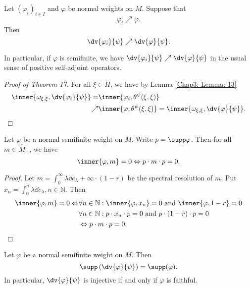 \begin{theorem}
    Let $(\varphi_i)_{i\in I}$ and $\varphi$ be normal weights on $M$. Suppose that
    \[
        \varphi_i\nearrow \varphi.
    \]
    Then
    \[
        \dv{\varphi_i}{\psi}\nearrow\dv{\varphi}{\psi}.
    \]
\end{theorem}
\begin{remark}
    In particular, if $\varphi$ is semifinite, we have $\dv{\varphi_i}{\psi}\nearrow\dv{\varphi}{\psi}$ in the usual sense of positive self-adjoint operators.
\end{remark}
\begin{proof}[Proof of Theorem 17]
    For all $\xi\in H$, we have by Lemma \ref{Chap3: Lemma: 13}
    \[
        \begin{split}
            \inner{\omega_{\xi,\xi},\dv{\varphi_i}{\psi}}=&\inner{\varphi_i,\theta^\psi(\xi,\xi)}\\
            \nearrow&\inner{\varphi,\theta^\psi(\xi,\xi)}=\inner{\omega_{\xi,\xi},\dv{\varphi}{\psi}}.
        \end{split}
    \]
\end{proof}
\begin{lemma}\label{Chap3: Lemma: 19}
    Let $\varphi$ be a normal semifinite weight on $M$. Write $p=\supp\varphi$. Then for all $m\in \widehat{M}_+$, we have
    \[
        \inner{\varphi,m}=0\Leftrightarrow p\cdot m\cdot p=0.
    \]
\end{lemma}
\begin{proof}
    Let $m=\int_0^\infty \lambda\dd e_\lambda+\infty\cdot (1-r)$ be the spectral resolution of $m$. Put $x_n=\int_0^n \lambda\dd e_\lambda,n\in \mathbb{N}$. Then
    \[
        \begin{split}
            \inner{\varphi,m}=0\Leftrightarrow&\forall n\in \mathbb{N}:\inner{\varphi,x_n}=0\text{ and }\inner{\varphi,1-r}=0\\
            &\forall n\in \mathbb{N}:p\cdot x_n\cdot p=0\text{ and }p\cdot(1-r)\cdot p=0\\
            &\Leftrightarrow p\cdot m\cdot p=0.
        \end{split}
    \]
\end{proof}
\begin{theorem}\label{Chap3: Thm: 20}
    Let $\varphi$ be a normal semifinite weight on $M$. Then
    \begin{equation}
        \supp\left( \dv{\varphi}{\psi} \right)=\supp(\varphi).
    \end{equation}
    In particular, $\dv{\varphi}{\psi}$ is injective if and only if $\varphi$ is faithful.
\end{theorem}
